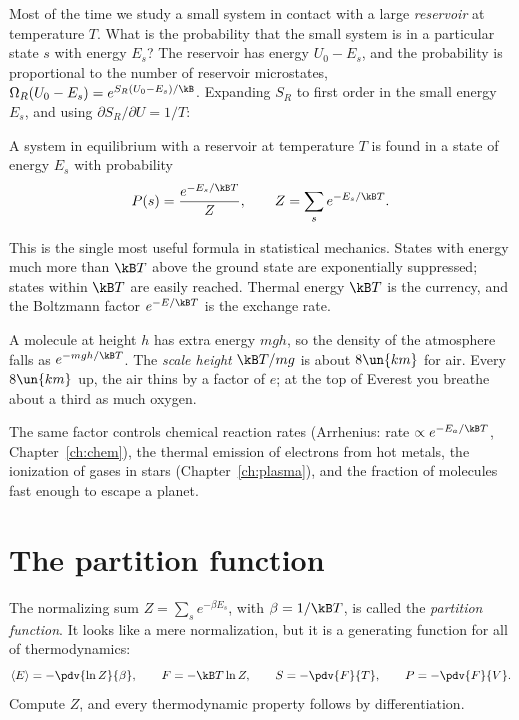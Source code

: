 Most of the time we study a small system in contact with a large \emph{reservoir} at temperature $T$. What is the probability that the small system is in a particular state $s$ with energy $E_s$? The reservoir has energy $U_0 - E_s$, and the probability is proportional to the number of reservoir microstates, $\Omega_R(U_0 - E_s) = e^{S_R(U_0 - E_s)/\kB}$. Expanding $S_R$ to first order in the small energy $E_s$, and using $\partial S_R/\partial U = 1/T$:

\begin{law}
A system in equilibrium with a reservoir at temperature $T$ is found in a state of energy $E_s$ with probability
\[
  P(s) = \frac{e^{-E_s/\kB T}}{Z}, \qquad Z = \sum_s e^{-E_s/\kB T}.
\]
\end{law}

This is the single most useful formula in statistical mechanics. States with energy much more than $\kB T$ above the ground state are exponentially suppressed; states within $\kB T$ are easily reached. Thermal energy $\kB T$ is the currency, and the Boltzmann factor $e^{-E/\kB T}$ is the exchange rate.

\begin{example}
A molecule at height $h$ has extra energy $mgh$, so the density of the atmosphere falls as $e^{-mgh/\kB T}$. The \emph{scale height} $\kB T/mg$ is about $8\un{km}$ for air. Every $8\un{km}$ up, the air thins by a factor of $e$; at the top of Everest you breathe about a third as much oxygen.
\end{example}

The same factor controls chemical reaction rates (Arrhenius: rate $\propto e^{-E_a/\kB T}$, Chapter~\ref{ch:chem}), the thermal emission of electrons from hot metals, the ionization of gases in stars (Chapter~\ref{ch:plasma}), and the fraction of molecules fast enough to escape a planet.

\section{The partition function}

The normalizing sum $Z = \sum_s e^{-\beta E_s}$, with $\beta = 1/\kB T$, is called the \emph{partition function}. It looks like a mere normalization, but it is a generating function for all of thermodynamics:
\[
  \langle E\rangle = -\pdv{\ln Z}{\beta}, \qquad F = -\kB T\ln Z, \qquad S = -\pdv{F}{T}, \qquad P = -\pdv{F}{V}.
\]
Compute $Z$, and every thermodynamic property follows by differentiation.

